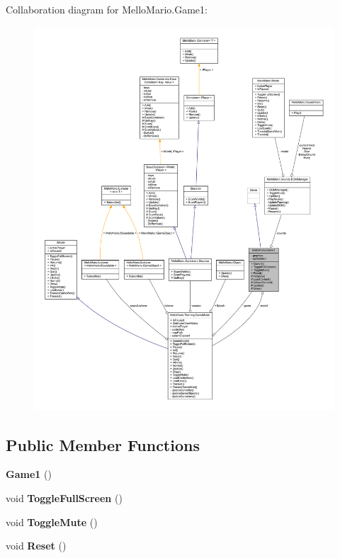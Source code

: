 Collaboration diagram for Mello\+Mario.\+Game1\+:
\nopagebreak
\begin{figure}[H]
\begin{center}
\leavevmode
\includegraphics[width=350pt]{classMelloMario_1_1Game1__coll__graph}
\end{center}
\end{figure}
\subsection*{Public Member Functions}
\begin{DoxyCompactItemize}
\item 
\textbf{ Game1} ()
\item 
void \textbf{ Toggle\+Full\+Screen} ()
\item 
void \textbf{ Toggle\+Mute} ()
\item 
void \textbf{ Reset} ()
\end{DoxyCompactItemize}
